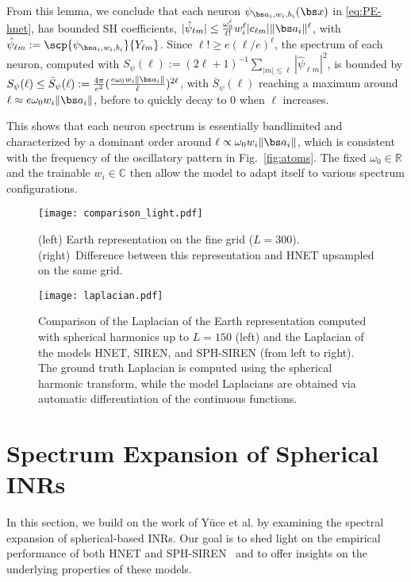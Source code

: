 \documentclass[conference]{IEEEtran}
\begin{document}
From this lemma, we conclude that each neuron 
$\psi_{\bs a_i, w_i, b_i}(\bs x)$
in \eqref{eq:PE-hnet}, has bounded SH coefficients, \ie  
$|\hat{\psi}_{\ell m}| \leq \frac{\omega_0^\ell}{\ell!} w_i^{\ell} |c_{\ell m}| \|\bs a_i\|^\ell$, with $\hat{\psi}_{\ell m} := \scp{\psi_{\bs a_i, w_i, b_i}}{Y_{\ell m}}$. Since $\ell! \geq e(\ell/e)^\ell$, the spectrum of each neuron, computed with $S_\psi(\ell):=(2\ell +1)^{-1}\sum_{|m|\leq \ell} |\hat{\psi}_{\ell m}|^2$, is bounded by $S_\psi(\ell) \leq \bar S_\psi(\ell) := \frac{4\pi}{e^2} (\frac{e \omega_0 w_i \|\bs a_i\|}{\ell})^{2\ell}$, with $\bar S_\psi(\ell)$ reaching a maximum around $\ell \approx e \omega_0 w_i \|\bs a_i\|$, before to quickly decay to 0 when $\ell$ increases. 

This shows that each neuron spectrum is essentially bandlimited and characterized by a dominant order around $\ell \propto \omega_0 w_i \|\bs a_i\|$, which is consistent with the frequency of the oscillatory pattern in Fig.~\ref{fig:atoms}. The fixed $\omega_0\in\mathbb{R}$ and the trainable $w_i\in\mathbb{C}$ then allow the model to adapt itself to various spectrum configurations. 


\begin{figure}[!t]
    \centering
    \texttt{[image: comparison\_light.pdf]}
    \vspace{-2.5em}
    \caption{(left) Earth representation on the fine grid ($L = 300$). (right)~Difference between this representation and HNET upsampled on the same grid.}
    \vspace{-1em}
    \label{fig:experience_high_resolution}
\end{figure}
 
\begin{figure*}[htbp] 
    \centering
    \texttt{[image: laplacian.pdf]}
    \caption{Comparison of the Laplacian of the Earth representation computed with spherical harmonics up to $L = 150$ (left) and the Laplacian of the models HNET, SIREN, and SPH-SIREN (from left to right). The ground truth Laplacian is computed using the spherical harmonic transform, while the model Laplacians are obtained via automatic differentiation of the continuous functions.}
    \vspace{-1em}
    \label{fig:experience_laplacian}
\end{figure*}


\section{Spectrum Expansion of Spherical INRs}
\label{sec:spectrum_expansion}
In this section, we build on the work of Yüce et al. \cite{yuce2022structureddictionaryperspectiveimplicit} by examining the spectral expansion of spherical-based INRs. Our goal is to shed light on the empirical performance of both HNET and SPH-SIREN~\cite{russwurm2024locationencoding} and to offer insights on the underlying properties of these models.
\end{document}
